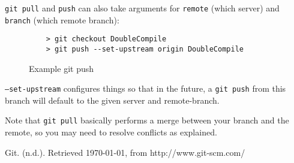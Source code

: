 \documentclass[11pt]{report}
\begin{document}
\texttt{git pull} and \texttt{push} can also take arguments for
\texttt{remote} (which server) and \texttt{branch} (which remote
branch):

\begin{figure}[H]
  \caption{Example git push}
  \begin{lstlisting}
    > git checkout DoubleCompile
    > git push --set-upstream origin DoubleCompile
  \end{lstlisting}
\end{figure}

\texttt{--set-upstream} configures things so that in the future, a
\texttt{git push} from this branch will default to the given server
and remote-branch.

Note that \texttt{git pull} basically performs a merge between your
branch and the remote, so you may need to resolve conflicts as
explained.

\begin{thebibliography}{9}

    Git. (n.d.). Retrieved \today, from http://www.git-scm.com/

\end{thebibliography}
\end{document}
